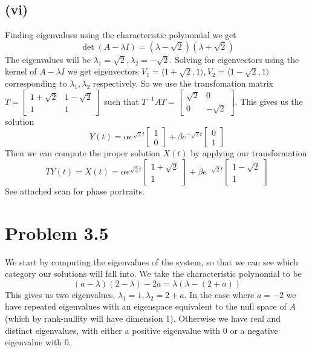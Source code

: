 \documentclass{article}
\theoremstyle{definition}
\begin{document}
\subsection*{(vi)}
Finding eigenvalues using the characteristic polynomial we get 
\[
    \det (A - \lambda I) = (\lambda - \sqrt{2})(\lambda + \sqrt{2})
\]
The eigenvalues will be $\lambda_1 = \sqrt{2}, \lambda_2 = -\sqrt{2}$.
Solving for eigenvectors using the kernel of $A - \lambda I$ we get eigenvectors
$V_1 = \langle 1 + \sqrt{2}, 1 \rangle, V_2 = \langle 1 - \sqrt{2}, 1 \rangle$ corresponding to $\lambda_1, \lambda_2$
respectively. So we use the transfomation matrix $T = \begin{bmatrix}
    1 + \sqrt{2} & 1 - \sqrt{2} \\ 1 & 1
\end{bmatrix}$ such that $T^{-1}AT = \begin{bmatrix}
    \sqrt{2}&0\\0&-\sqrt{2}
\end{bmatrix}$.
This gives us the solution 
\[
    Y(t) = \alpha e^{\sqrt{2} t} \begin{bmatrix}
        1\\0
    \end{bmatrix} + \beta e^{-\sqrt{2} t} \begin{bmatrix}
        0\\1
    \end{bmatrix}
\]
Then we can compute the proper solution $X(t)$ by applying our transformation
\[
    TY(t) = X(t) = \alpha e^{\sqrt{2} t} \begin{bmatrix}
        1 + \sqrt{2} \\ 1
    \end{bmatrix} + \beta e^{-\sqrt{2} t} \begin{bmatrix}
        1 - \sqrt{2}\\ 1
    \end{bmatrix}
\]
See attached scan for phase portraits.
\section*{Problem 3.5}
We start by computing the eigenvalues of the system, so that we can see which category our solutions will fall into.
We take the characteristic polynomial to be 
\[
    (a - \lambda)(2 - \lambda) - 2a = \lambda(\lambda - (2 + a))
\]
This gives us two eigenvalues, $\lambda_1 = 1, \lambda_2 = 2 + a$.
In the case where $a = -2$ we have repeated eigenvalues with an eigenspace equivalent
to the null space of $A$ (which by rank-nullity will have dimension 1). Otherwise we have real and distinct eigenvalues, with either a positive eigenvalue with 0 or a negative eigenvalue with 0.
\end{document}
